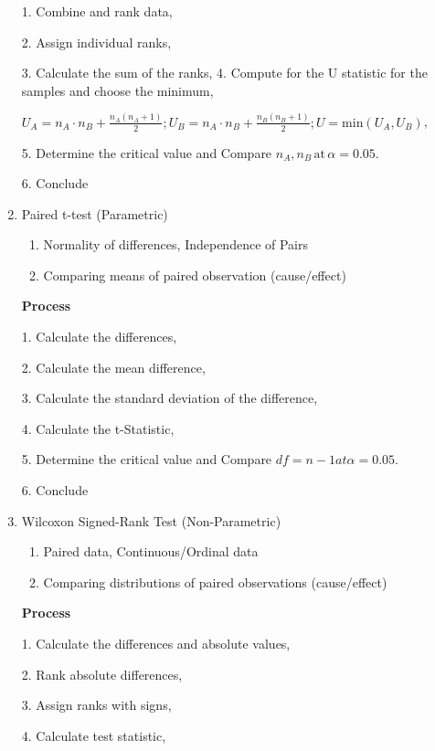 \documentclass[6pt]{article}
\begin{document}
\begin{multicols*}{2}
\begin{enumerate}
            1. Combine and rank data,

            2. Assign individual ranks, 

            3. Calculate the sum of the ranks,
            4.
            Compute for the U statistic for the samples and choose the minimum,
            
            $\displaystyle U_A = n_A \cdot n_B + \frac{n_A(n_A+1)}{2}; U_B = n_A \cdot n_B + \frac{n_B(n_B+1)}{2}; U = \text{min}(U_A,U_B)$,

            5. Determine the critical value and Compare $n_A, n_B \, \text{at} \, \alpha = 0.05$.

            6. Conclude

        \item Paired t-test (Parametric)
        \begin{enumerate}
            \item Normality of differences, Independence of Pairs
            \item Comparing means of paired observation (cause/effect)
        \end{enumerate}
        \textbf{Process}

            1. Calculate the differences,

            2. Calculate the mean difference, 

            3. Calculate the standard deviation of the difference, 

            4. Calculate the t-Statistic,

            5. Determine the critical value and Compare $df = n - 1 at \alpha = 0.05$.

            6. Conclude


        \item Wilcoxon Signed-Rank Test (Non-Parametric)
        \begin{enumerate}
            \item Paired data, Continuous/Ordinal data
            \item Comparing distributions of paired observations (cause/effect)
        \end{enumerate}
        \textbf{Process}

            1. Calculate the differences and absolute values,

            2. Rank absolute differences, 

            3. Assign ranks with signs,

            4. Calculate test statistic,


\end{enumerate}
\end{multicols*}
\end{document}
